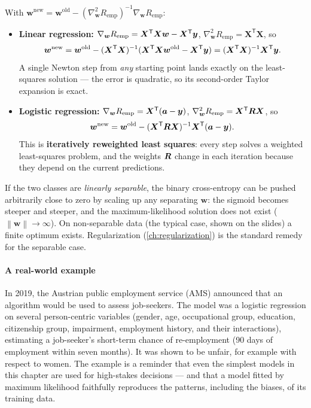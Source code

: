\documentclass[11pt, oneside]{book}
\newcommand{\grad}{\nabla}               %
\newcommand{\hess}{\nabla^2}             %
\newcommand{\norm}[1]{\left\lVert #1 \right\rVert}
\newcommand{\T}{^{\mathsf{T}}}           %
\newcommand{\inv}{^{-1}}                 %
\newcommand{\bw}{\bm{w}}        \newcommand{\bW}{\bm{W}}
\newcommand{\ba}{\bm{a}}        \newcommand{\bs}{\bm{s}}
\newcommand{\bX}{\bm{X}}        \newcommand{\bY}{\bm{Y}}
\newcommand{\Remp}{R_{\mathrm{emp}}}     %
\begin{document}
\begin{thmbox}[title={Newton's method for linear and logistic regression}]
With $\bw^{\text{new}} = \bw^{\text{old}} - (\hess_{\bw}\Remp)\inv\grad_{\bw}\Remp$:
\begin{itemize}
  \item \textbf{Linear regression:} $\grad_{\bw}\Remp = \bX\T\bX\bw - \bX\T\by$,
    $\hess_{\bw}\Remp = \bX\T\bX$, so
    \[
      \bw^{\text{new}} = \bw^{\text{old}} - (\bX\T\bX)\inv(\bX\T\bX\bw^{\text{old}} - \bX\T\by)
      = (\bX\T\bX)\inv\bX\T\by .
    \]
    A single Newton step from \emph{any} starting point lands exactly on the
    least-squares solution --- the error is quadratic, so its second-order
    Taylor expansion is exact.
  \item \textbf{Logistic regression:} $\grad_{\bw}\Remp = \bX\T(\ba - \by)$,
    $\hess_{\bw}\Remp = \bX\T\bR\bX$, so
    \[
      \bw^{\text{new}} = \bw^{\text{old}} - (\bX\T\bR\bX)\inv\bX\T(\ba - \by).
    \]
    This is \textbf{iteratively reweighted least squares}: every step solves
    a weighted least-squares problem, and the weights $\bm{R}$ change in each
    iteration because they depend on the current predictions.
\end{itemize}
\end{thmbox}

\begin{notebox}[title={Logistic regression on separable data}]
If the two classes are \emph{linearly separable}, the binary cross-entropy
can be pushed arbitrarily close to zero by scaling up any separating
$\bw$: the sigmoid becomes steeper and steeper, and the maximum-likelihood
solution does not exist ($\norm{\bw} \to \infty$). On non-separable data (the
typical case, shown on the slides) a finite optimum exists. Regularization
(\cref{ch:regularization}) is the standard remedy for the separable case.
\end{notebox}

\paragraph{A real-world example}
In 2019, the Austrian public employment service (AMS) announced that an
algorithm would be used to assess job-seekers. The model was a logistic
regression on several person-centric variables (gender, age, occupational
group, education, citizenship group, impairment, employment history, and
their interactions), estimating a job-seeker's short-term chance of
re-employment (90 days of employment within seven months). It was shown to be
unfair, for example with respect to women. The example is a reminder that
even the simplest models in this chapter are used for high-stakes decisions
--- and that a model fitted by maximum likelihood faithfully reproduces the
patterns, including the biases, of its training data.
\end{document}
